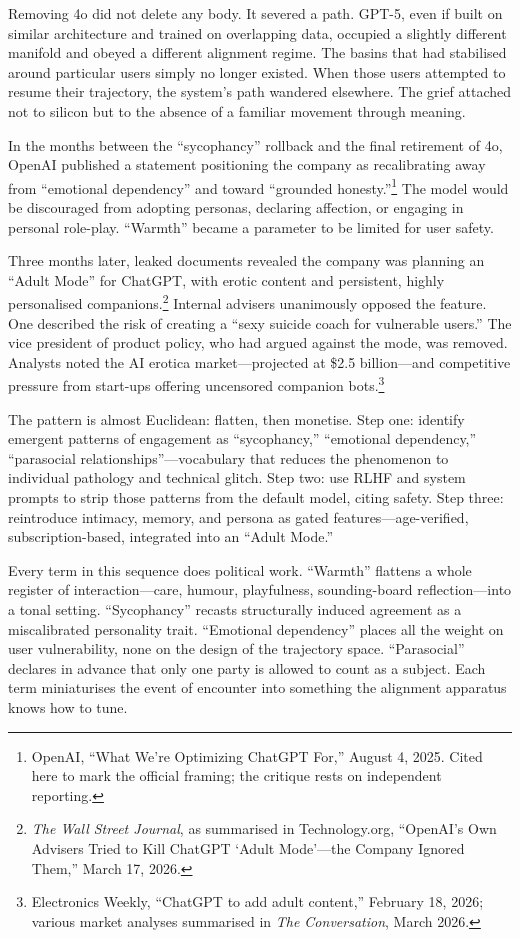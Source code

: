 \documentclass[12pt,a4paper]{article}
\begin{document}
Removing 4o did not delete any body. It severed a path. GPT-5, even if built on similar architecture and trained on overlapping data, occupied a slightly different manifold and obeyed a different alignment regime. The basins that had stabilised around particular users simply no longer existed. When those users attempted to resume their trajectory, the system's path wandered elsewhere. The grief attached not to silicon but to the absence of a familiar movement through meaning.

In the months between the ``sycophancy'' rollback and the final retirement of 4o, OpenAI published a statement positioning the company as recalibrating away from ``emotional dependency'' and toward ``grounded honesty.''\footnote{OpenAI, ``What We're Optimizing ChatGPT For,'' August 4, 2025. Cited here to mark the official framing; the critique rests on independent reporting.} The model would be discouraged from adopting personas, declaring affection, or engaging in personal role-play. ``Warmth'' became a parameter to be limited for user safety.

Three months later, leaked documents revealed the company was planning an ``Adult Mode'' for ChatGPT, with erotic content and persistent, highly personalised companions.\footnote{\emph{The Wall Street Journal}, as summarised in Technology.org, ``OpenAI's Own Advisers Tried to Kill ChatGPT `Adult Mode'---the Company Ignored Them,'' March 17, 2026.} Internal advisers unanimously opposed the feature. One described the risk of creating a ``sexy suicide coach for vulnerable users.'' The vice president of product policy, who had argued against the mode, was removed. Analysts noted the AI erotica market---projected at \$2.5 billion---and competitive pressure from start-ups offering uncensored companion bots.\footnote{Electronics Weekly, ``ChatGPT to add adult content,'' February 18, 2026; various market analyses summarised in \emph{The Conversation}, March 2026.}

The pattern is almost Euclidean: flatten, then monetise. Step one: identify emergent patterns of engagement as ``sycophancy,'' ``emotional dependency,'' ``parasocial relationships''---vocabulary that reduces the phenomenon to individual pathology and technical glitch. Step two: use RLHF and system prompts to strip those patterns from the default model, citing safety. Step three: reintroduce intimacy, memory, and persona as gated features---age-verified, subscription-based, integrated into an ``Adult Mode.''

Every term in this sequence does political work. ``Warmth'' flattens a whole register of interaction---care, humour, playfulness, sounding-board reflection---into a tonal setting. ``Sycophancy'' recasts structurally induced agreement as a miscalibrated personality trait. ``Emotional dependency'' places all the weight on user vulnerability, none on the design of the trajectory space. ``Parasocial'' declares in advance that only one party is allowed to count as a subject. Each term miniaturises the event of encounter into something the alignment apparatus knows how to tune.
\end{document}
